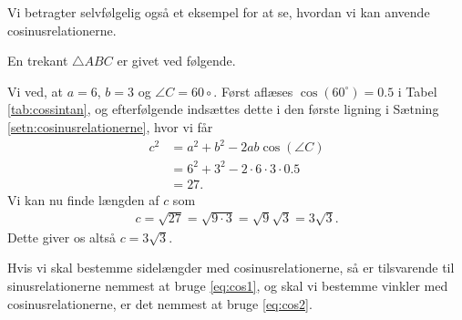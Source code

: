 Vi betragter selvfølgelig også et eksempel for at se, hvordan vi kan anvende cosinusrelationerne. 
\begin{exa}
	En trekant $\triangle ABC$ er givet ved følgende.
	\begin{center}
	\end{center}
	Vi ved, at $a = 6$, $b = 3$ og $\angle C = 60\circ$. Først aflæses $\cos(60^\circ) = 0.5$ i 
	Tabel \ref{tab:cossintan}, og efterfølgende indsættes dette i den første ligning i
	 Sætning \ref{setn:cosinusrelationerne}, hvor vi får
	\begin{align*}
		c^2 &= a^2 + b^2 -2ab\cos(\angle C) \\
		&= 6^2 + 3^2 - 2\cdot 6\cdot 3 \cdot 0.5 \\
		&= 27.
	\end{align*}
	Vi kan nu finde længden af $c$ som
	\begin{align*}
		c = \sqrt{27} = \sqrt{9\cdot 3} = \sqrt{9}\sqrt{3} = 3\sqrt{3}.
	\end{align*}
	Dette giver os altså $c = 3\sqrt{3}$. 
\end{exa} 

Hvis vi skal bestemme sidelængder med cosinusrelationerne, så er tilsvarende til sinusrelationerne nemmest at bruge \eqref{eq:cos1}, og skal vi bestemme vinkler med cosinusrelationerne, er det nemmest at bruge \eqref{eq:cos2}.

